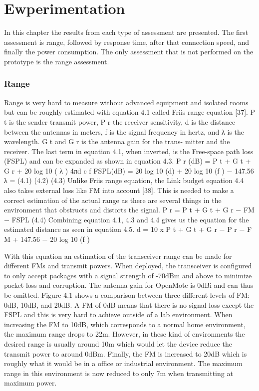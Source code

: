 \section{Ewperimentation}

In this chapter the results from each type of assessment are presented.
The first assessment is range,
	followed by response time,
	after that connection speed,
	and finally the power consumption.
The only assessment that is not performed on the prototype is the range assessment.

\subsubsection{Range}
Range is very hard to measure without advanced equipment and isolated
rooms but can be roughly estimated with equation 4.1 called Friis range
equation [37]. P t is the sender transmit power, P r the receiver sensitivity, d
is the distance between the antennas in meters, f is the signal frequency in
hertz, and λ is the wavelength. G t and G r is the antenna gain for the trans-
mitter and the receiver. The last term in equation 4.1, when inverted, is the
Free-space path loss (FSPL) and can be expanded as shown in equation 4.3.
P r (dB) = P t + G t + G r + 20 log 10 (
λ
)
4πd
c
f
FSPL(dB) = 20 log 10 (d) + 20 log 10 (f ) − 147.56
λ =
(4.1)
(4.2)
(4.3)
Unlike Friis range equation, the Link budget equation 4.4 also takes external
loss like FM into account [38]. This is needed to make a correct estimation of
the actual range as there are several things in the environment that obstructs
and distorts the signal.
P r = P t + G t + G r − FM − FSPL
(4.4)
Combining equation 4.1, 4.3 and 4.4 gives us the equation for the estimated
distance as seen in equation 4.5.
d = 10 x
P t + G t + G r − P r − F M + 147.56 − 20 log 10 (f )


With this equation an estimation of the transceiver range can be made for different FMs and transmit powers.
When deployed,
	the transceiver is configured to only accept packages with a signal strength of -70dBm and above to minimize packet loss and corruption.
The antenna gain for OpenMote is 0dBi and can thus be omitted.
Figure 4.1 shows a comparison between three different levels of FM: 0dB, 10dB,
	and 20dB.
A FM of 0dB means that there is no signal loss except the FSPL and this is very hard to achieve outside of a lab environment.
When increasing the FM to 10dB,
	which corresponds to a normal home environment,
	the maximum range drops to 22m.
However,
	in these kind of environments the desired range is usually around 10m which would let the device reduce the transmit power to around 0dBm.
Finally,
	the FM is increased to 20dB which is roughly what it would be in a office or industrial environment.
The maximum range in this environment is now reduced to only 7m when transmitting at maximum power.

